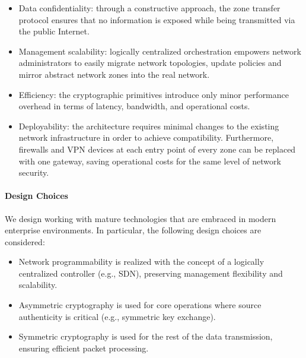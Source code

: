 \begin{itemize}
	\item Data confidentiality: through a constructive approach, the zone transfer 
	protocol ensures that no information
	is exposed while being transmitted via the public Internet. 
	\item Management scalability: logically centralized orchestration empowers 
	network administrators to easily migrate network topologies, update policies and 
	mirror abstract network zones into the real network.
	\item Efficiency: the cryptographic primitives introduce only minor performance 
	overhead in terms of latency, bandwidth, and operational costs.
	\item Deployability: the \name architecture requires minimal changes to the
	existing network infrastructure in order to achieve compatibility. Furthermore, 
	firewalls and VPN devices
    at each entry point of every zone can be replaced with one \name gateway, saving
	operational costs for the same level of network security.
\end{itemize}
 

\paragraph{Design Choices}
We design \name working with mature technologies that are embraced in modern enterprise 
environments. In particular, the following design choices are considered:

\begin{itemize}
	\item Network programmability is realized with the concept of a logically centralized 
	controller (e.g., SDN), preserving management flexibility and scalability.
	\item Asymmetric cryptography is used for core operations where source
	authenticity is critical (e.g., symmetric key exchange).
	\item Symmetric cryptography is used for the rest of the data 
	transmission, ensuring efficient packet processing.
\end{itemize}

